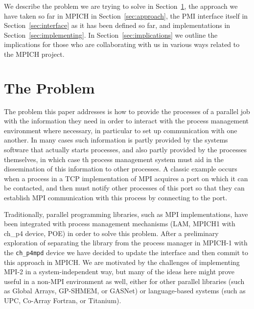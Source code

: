 \documentclass[11pt]{article}
\begin{document}
We describe the problem we are trying to solve in
Section~\ref{sec:problem}, the approach we have taken so far in MPICH
in Section~\ref{sec:approach}, the PMI interface itself in
Section~\ref{sec:interface} as it has been defined so far, and
implementations in Section~\ref{sec:implementing}.  In
Section~\ref{sec:implications} we outline the implications for those who
are collaborating with us in various ways related to the MPICH project. 

\section{The Problem}
\label{sec:problem}

The problem this paper addresses is how to provide the processes of a
parallel job with the information they need in order to interact with
the process management environment where necessary, in particular to set
up communication with one another.  In many cases such information is
partly provided by the systems software that actually starts processes,
and also partly provided by the processes themselves, in which case th
process management system must aid in the dissemination of this
information to other processes.  A classic example occurs when a process
in a TCP implementation of MPI acquires a port on which it can be
contacted, and then must notify other processes of this port so that
they can establish MPI communication with this process by connecting to
the port.

Traditionally, parallel programming libraries, such as MPI
implementations, have been integrated with process management mechanisms
(LAM, MPICH1 with ch\_p4 device, POE) in order to solve this problem.
After a preliminary exploration of separating the library from the
process manager in MPICH-1 with the {\tt ch\_p4mpd} device we have decided to
update the interface and then commit to this approach in MPICH.  We are
motivated by the challenges of implementing MPI-2 in a
system-independent way, but many of the ideas here might prove useful in
a non-MPI environment as well, either for other parallel libraries (such
as Global Arrays, GP-SHMEM, or GASNet) or language-based systems (such
as UPC, Co-Array Fortran, or Titanium).
\end{document}
